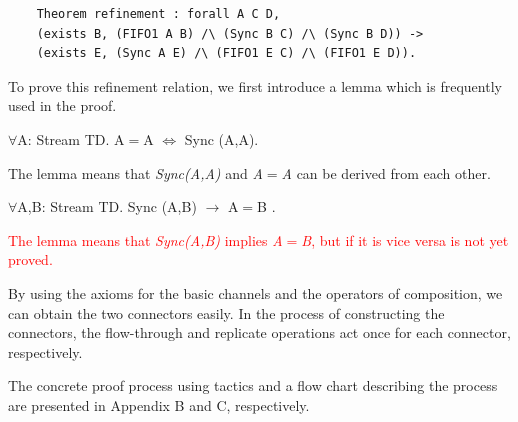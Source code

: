 \documentclass{llncs}
\newcommand{\redt}[1]{\textcolor{red}{#1}}
\begin{document}
\begin{example}[Refinement]
\begin{verbatim}
    Theorem refinement : forall A C D,
    (exists B, (FIFO1 A B) /\ (Sync B C) /\ (Sync B D)) ->
    (exists E, (Sync A E) /\ (FIFO1 E C) /\ (FIFO1 E D)).
\end{verbatim}



To prove this refinement relation, we first introduce a lemma which is frequently used in the proof.
\begin{lemma}\label{lemma:eq_self}
$\forall$A: Stream TD.
  A$=$A $\Leftrightarrow$ Sync (A,A).
\end{lemma}
The lemma means that \emph{Sync(A,A)} and \emph{A$=$A} can be derived from each other.
\begin{lemma}[Eq]\label{lemma:eq}
$\forall$A,B: Stream TD.
  Sync (A,B) $\rightarrow$ A$=$B .
\end{lemma}
\redt{The lemma means that \emph{Sync(A,B)} implies \emph{A$=$B}, but if it is vice versa is not yet proved.}


By using the axioms for the basic channels and the operators of composition, we can obtain the two connectors easily.
In the process of constructing the connectors, the flow-through and replicate operations act once for each connector, respectively.


The concrete proof process using tactics and a flow chart describing the process are presented in Appendix B and C, respectively.
\end{example}
\end{document}
